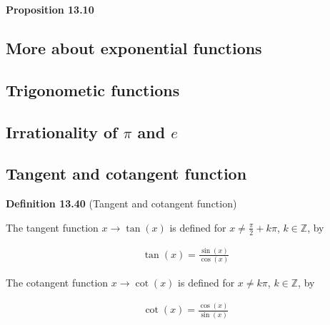 \documentclass[11pt]{article}
\begin{document}
\textbf{Proposition 13.10} %

\newpage

\begin{center}
    \section*{More about exponential functions}
\end{center}

\newpage

\begin{center}
    \section*{Trigonometic functions}
\end{center}

\newpage

\begin{center}
    \section*{Irrationality of $\pi$ and $e$}
\end{center}




\newpage


\begin{center}
\section*{Tangent and cotangent function}
\end{center}

\textbf{Definition 13.40} (Tangent and cotangent function)

The tangent function $x \to \tan(x)$ is defined for $x \neq \frac{\pi}{2} + k \pi$, $k \in \mathbb{Z}$, by 

\begin{align*}
    \tan(x) = \frac{\sin(x)}{\cos(x)}
\end{align*}

The cotangent function $x \to \cot(x)$ is defined for $x \neq k \pi$, $k \in \mathbb{Z}$, by 

\begin{align*}
    \cot(x) = \frac{\cos(x)}{\sin(x)}
\end{align*}
\end{document}

